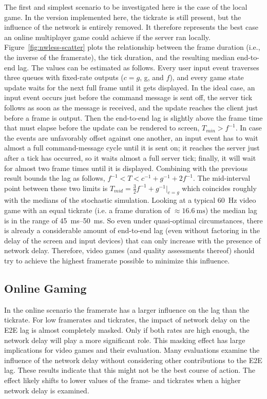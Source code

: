 The first and simplest scenario to be investigated here is the case of the local game. In the version implemented here, the tickrate is still present, but the influence of the network is entirely removed. It therefore represents the best case an online multiplayer game could achieve if the server ran locally. Figure~\ref{fig:nwless-scatter} plots the relationship between the frame duration (i.e., the inverse of the framerate), the tick duration, and the resulting median end-to-end lag. The values can be estimated as follows. Every user input event traverses three queues with fixed-rate outputs ($c=g$, g, and $f$), and every game state update waits for the next full frame until it gets displayed. In the ideal case, an input event occurs just before the command message is sent off, the server tick follows as soon as the message is received, and the update reaches the client just before a frame is output. Then the end-to-end lag is slightly above the frame time that must elapse before the update can be rendered to screen, $T_{min}>f^{-1}$. In case the events are unfavorably offset against one another, an input event has to wait almost a full command-message cycle until it is sent on; it reaches the server just after a tick has occurred, so it waits almost a full server tick; finally, it will wait for almost two frame times until it is displayed. Combining with the previous result bounds the lag as follows, $f^{-1} < T < c^{-1}+g^{-1}+2f^{-1}$. The mid-interval point between these two limits is $T_{mid}=\frac{3}{2} f^{-1} + g^{-1}|_{c=g}$ which coincides roughly with the medians of the stochastic simulation. Looking at a typical \SI{60}{\hertz} video game with an equal tickrate (i.e. a frame duration of $\approx \SI{16.6}{\milli\second}$) the median lag is in the range of \SIrange{45}{50}{\milli\second}. So even under quasi-optimal circumstances, there is already a considerable amount of end-to-end lag (even without factoring in the delay of the screen and input devices) that can only increase with the presence of network delay. Therefore, video games (and quality assessments thereof) should try to achieve the highest framerate possible to minimize this influence.

\subsection{Online Gaming}


 In the online scenario the framerate has a larger influence on the lag than the tickrate. For low framerates and tickrates, the impact of network delay on the \gls{E2E} lag is almost completely masked. Only if both rates are high enough, the network delay will play a more significant role. This masking effect has large implications for video games and their evaluation. Many evaluations examine the influence of the network delay without considering other contributions to the \gls{E2E} lag. These results indicate that this might not be the best course of action. The effect likely shifts to lower values of the frame- and tickrates when a higher network delay is examined.


